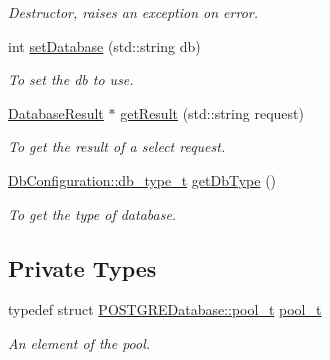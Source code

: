 \begin{DoxyCompactItemize}
\begin{DoxyCompactList}\small\item\em Destructor, raises an exception on error. \item\end{DoxyCompactList}\item 
int \hyperlink{classPOSTGREDatabase_acadff2a3649a40b323eb7711e0d705cf}{setDatabase} (std::string db)
\begin{DoxyCompactList}\small\item\em To set the db to use. \item\end{DoxyCompactList}\item 
\hyperlink{classDatabaseResult}{DatabaseResult} $\ast$ \hyperlink{classPOSTGREDatabase_a4be2769e7d13be7f139b540ffb3a4760}{getResult} (std::string request)
\begin{DoxyCompactList}\small\item\em To get the result of a select request. \item\end{DoxyCompactList}\item 
\hyperlink{classDbConfiguration_a4a57e43a5017a5c4833a784a994c91cf}{DbConfiguration::db\_\-type\_\-t} \hyperlink{classPOSTGREDatabase_a6f446f99cff05695b37165ee0ce22a9a}{getDbType} ()
\begin{DoxyCompactList}\small\item\em To get the type of database. \item\end{DoxyCompactList}\end{DoxyCompactItemize}
\subsection*{Private Types}
\begin{DoxyCompactItemize}
\item 
\hypertarget{classPOSTGREDatabase_a48a0b798834146488a3626ea8af3acdb}{
typedef struct \hyperlink{structPOSTGREDatabase_1_1pool__t}{POSTGREDatabase::pool\_\-t} \hyperlink{classPOSTGREDatabase_a48a0b798834146488a3626ea8af3acdb}{pool\_\-t}}
\label{classPOSTGREDatabase_a48a0b798834146488a3626ea8af3acdb}

\begin{DoxyCompactList}\small\item\em An element of the pool. \item\end{DoxyCompactList}\end{DoxyCompactItemize}
